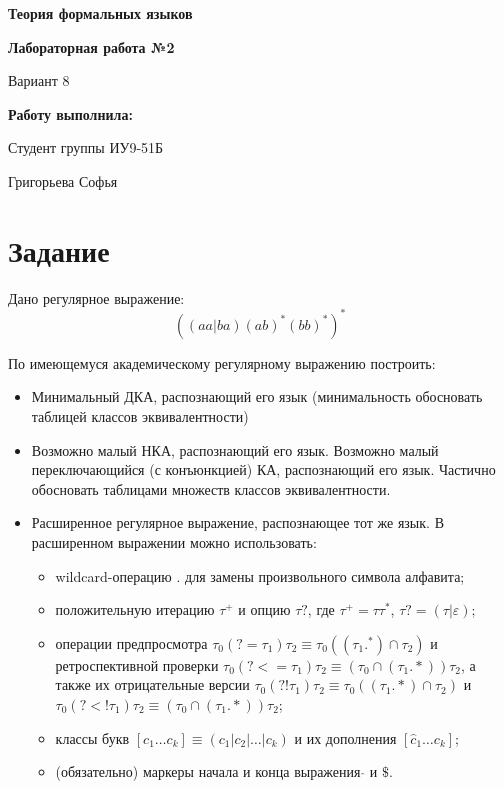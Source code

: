 \documentclass[a4paper,12pt]{article}
\begin{document}
\begin{titlepage}
\centering

{\LARGE \textbf{Теория формальных языков} \par}
\vspace{0.5cm}

{\large \textbf{Лабораторная работа №2} \par}
{\large Вариант 8 \par}
\vspace{1.5cm}

{\large \textbf{Работу выполнила:} \par}
{\large Студент группы ИУ9-51Б \par}
{\large Григорьева Софья \par}

\end{titlepage}



\tableofcontents
\newpage


\section{Задание}

Дано регулярное выражение:
\[
((aa | ba)(ab)^*(bb)^*)^*
\]

По имеющемуся академическому регулярному выражению построить:

\begin{itemize}
\item Минимальный ДКА, распознающий его язык (минимальность обосновать таблицей классов эквивалентности)
\item Возможно малый НКА, распознающий его язык. Возможно малый переключающийся (с конъюнкцией) КА, распознающий его язык. Частично обосновать таблицами множеств классов эквивалентности.
\item Расширенное регулярное выражение, распознающее тот же язык. В расширенном выражении можно использовать:
    \begin{itemize}
    \item wildcard-операцию $.$ для замены произвольного символа алфавита;
    \item положительную итерацию $\tau^+$ и опцию $\tau?$, где $\tau^+ = \tau\tau^*$, $\tau? = (\tau|\varepsilon)$;
    \item операции предпросмотра $\tau_0(?= \tau_1)\tau_2 \equiv \tau_0((\tau_1.^*) \cap \tau_2)$ и ретроспективной проверки $\tau_0(?<= \tau_1)\tau_2 \equiv (\tau_0 \cap (\tau_1.*))\tau_2$, а также их отрицательные версии $\tau_0(?! \tau_1)\tau_2 \equiv \tau_0((\tau_1.*) \cap \tau_2)$ и $\tau_0(?<! \tau_1)\tau_2 \equiv (\tau_0 \cap (\tau_1.*))\tau_2$;
    \item классы букв $[c_1 \ldots c_k] \equiv (c_1|c_2| \ldots |c_k)$ и их дополнения $[\hat{c}_1 \ldots c_k]$;
    \item (обязательно) маркеры начала и конца выражения $\hat{}$ и $\$$.
    \end{itemize}
\end{itemize}
\end{document}
